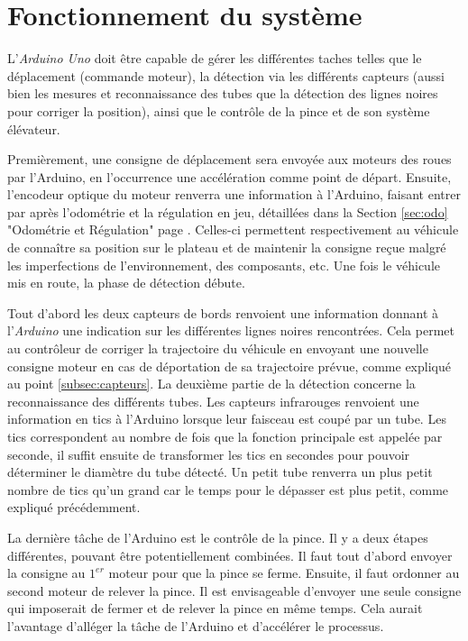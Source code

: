\documentclass[a4paper,11pt]{article}
\begin{document}
\section{Fonctionnement du système}

L'\textit{Arduino Uno} doit être capable de gérer les différentes taches telles que le déplacement (commande moteur), la détection via les différents capteurs (aussi bien les mesures et reconnaissance des tubes que la détection des lignes noires pour corriger la position), ainsi que le contrôle de la pince et de son système élévateur.

Premièrement, une consigne de déplacement sera envoyée aux moteurs des roues par l'Arduino, en l'occurrence une accélération comme point de départ. Ensuite, l'encodeur optique du moteur renverra une information à l'Arduino, faisant entrer par après l'odométrie et la régulation en jeu, détaillées dans la Section \ref{sec:odo} "Odométrie et Régulation" page \pageref{sec:odo}. Celles-ci permettent respectivement au véhicule de connaître sa position sur le plateau et de maintenir la consigne reçue malgré les imperfections de l'environnement, des composants, etc. Une fois le véhicule mis en route, la phase de détection débute.

Tout d'abord les deux capteurs de bords renvoient une information donnant à l'\textit{Arduino} une indication sur les différentes lignes noires rencontrées. Cela permet au contrôleur de corriger la trajectoire du véhicule en envoyant une nouvelle consigne moteur en cas de déportation de sa trajectoire prévue, comme expliqué au point \ref{subsec:capteurs}. La deuxième partie de la détection concerne la reconnaissance des différents tubes. Les capteurs infrarouges renvoient une information en tics à l'Arduino lorsque leur faisceau est coupé par un tube. Les tics correspondent au nombre de fois que la fonction principale est appelée par seconde, il suffit ensuite de transformer les tics en secondes pour pouvoir déterminer le diamètre du tube détecté. Un petit tube renverra un plus petit nombre de tics qu'un grand car le temps pour le dépasser est plus petit, comme expliqué précédemment.

La dernière tâche de l'Arduino est le contrôle de la pince. Il y a deux étapes différentes, pouvant être potentiellement combinées. Il faut tout d'abord envoyer la consigne au $1^{er}$ moteur pour que la pince se ferme. Ensuite, il faut ordonner au second moteur de relever la pince. Il est envisageable d'envoyer une seule consigne qui imposerait de fermer et de relever la pince en même temps. Cela aurait l'avantage d'alléger la tâche de l'Arduino et d'accélérer le processus.\\
\end{document}
